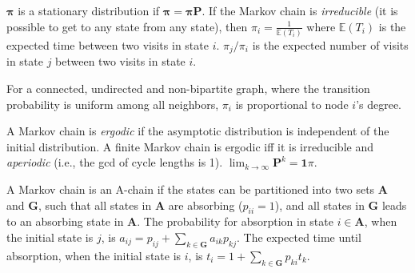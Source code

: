 $\mathbf{\pi}$ is a stationary distribution if $\mathbf{\pi} = \mathbf{\pi P}$.
If the Markov chain is \emph{irreducible} (it is possible to get to any state from any state),
then $\pi_i = \frac{1}{\mathbb{E}(T_i)}$ where $\mathbb{E}(T_i)$  is the expected time between two visits in state $i$.
$\pi_j/\pi_i$ is the expected number of visits in state $j$ between two visits in state $i$.

For a connected, undirected and non-bipartite graph, where the transition probability is uniform among all neighbors, $\pi_i$ is proportional to node $i$'s degree.

A Markov chain is \emph{ergodic} if the asymptotic distribution is independent of the initial distribution.
A finite Markov chain is ergodic iff it is irreducible and \emph{aperiodic} (i.e., the gcd of cycle lengths is 1).
$\lim_{k\rightarrow\infty}\mathbf{P}^k = \mathbf{1}\pi$.

A Markov chain is an A-chain if the states can be partitioned into two sets $\mathbf{A}$ and $\mathbf{G}$, such that all states in $\mathbf{A}$ are absorbing ($p_{ii}=1$), and all states in $\mathbf{G}$ leads to an absorbing state in $\mathbf{A}$.
The probability for absorption in state $i\in\mathbf{A}$, when the initial state is $j$, is $a_{ij} = p_{ij}+\sum_{k\in\mathbf{G}} a_{ik}p_{kj}$.
The expected time until absorption, when the initial state is $i$, is $t_i = 1+\sum_{k\in\mathbf{G}}p_{ki}t_k$.
